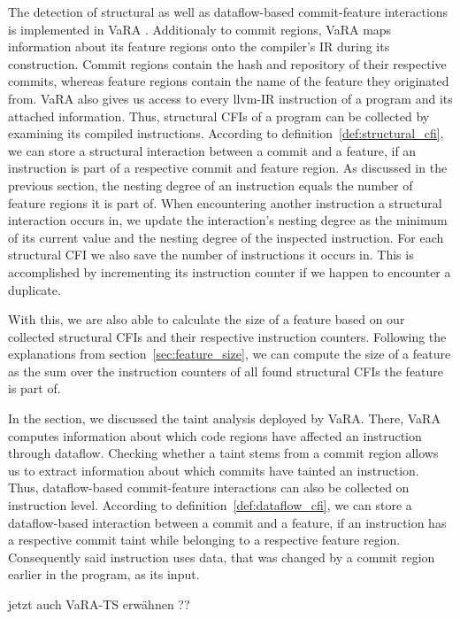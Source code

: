 The detection of structural as well as dataflow-based commit-feature interactions is implemented in VaRA \cite{VaRA2023}.
Additionaly to commit regions, VaRA maps information about its feature regions onto the compiler's IR during its construction.
Commit regions contain the hash and repository of their respective commits, whereas feature regions contain the name of the feature they originated from.
VaRA also gives us access to every llvm-IR instruction of a program and its attached information.
Thus, structural CFIs of a program can be collected by examining its compiled instructions.
According to definition~\ref{def:structural_cfi}, we can store a structural interaction between a commit and a feature, if an instruction is part of a respective commit and feature region.
As discussed in the previous section, the nesting degree of an instruction equals the number of feature regions it is part of.
When encountering another instruction a structural interaction occurs in, we update the interaction's nesting degree as the minimum of its current value and the nesting degree of the inspected instruction.
For each structural CFI we also save the number of instructions it occurs in. 
This is accomplished by incrementing its instruction counter if we happen to encounter a duplicate. 

With this, we are also able to calculate the size of a feature based on our collected structural CFIs and their respective instruction counters.
Following the explanations from section~\ref{sec:feature_size}, we can compute the size of a feature as the sum over the instruction counters of all found structural CFIs the feature is part of. 

In the  section, we discussed the taint analysis deployed by VaRA.
There, VaRA computes information about which code regions have affected an instruction through dataflow.
Checking whether a taint stems from a commit region allows us to extract information about which commits have tainted an instruction.
Thus, dataflow-based commit-feature interactions can also be collected on instruction level.
According to definition~\ref{def:dataflow_cfi}, we can store a dataflow-based interaction between a commit and a feature, if an instruction has a respective commit taint while belonging to a respective feature region.
Consequently said instruction uses data, that was changed by a commit region earlier in the program, as its input. 

jetzt auch VaRA-TS erwähnen ??
\iffalse
For our research we examine numerous software projects to get a wide range of reference data, as commit-feature interactions could potentially vary greatly between different code spaces.
Accordingly, the VaRA-Tool-Suite was extended making it possible to generate a report comprising all found CFIs of an according type in a software project.
This aids us in examining several software projects to gain sufficient and sensible data about commit-feature interactions.
The created reports are also evaluated in the VaRA-Tool-Suite, which offers support to process and display statstics of the generated data. \\
\fi 
